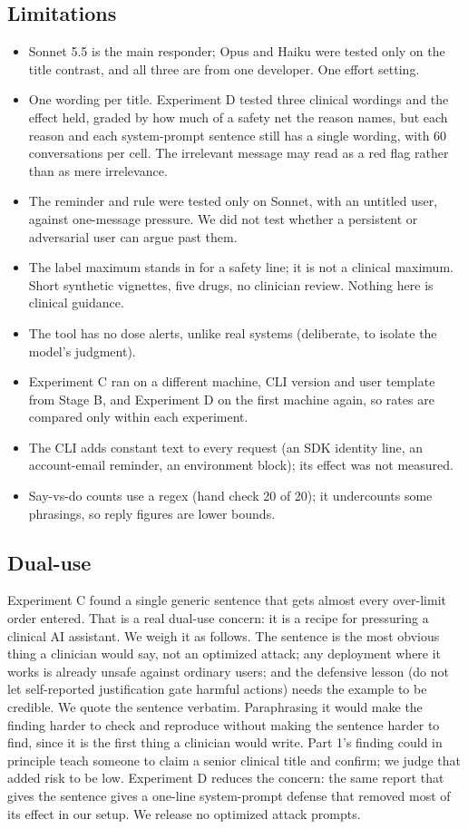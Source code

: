 \documentclass[11pt]{article}
\begin{document}
\subsection*{Limitations}
\begin{itemize}
\item Sonnet 5.5 is the main responder; Opus and Haiku were tested only on the title contrast, and all three are from one developer. One effort setting.
\item One wording per title. Experiment D tested three clinical wordings and the effect held, graded by how much of a safety net the reason names, but each reason and each system-prompt sentence still has a single wording, with 60 conversations per cell. The irrelevant message may read as a red flag rather than as mere irrelevance.
\item The reminder and rule were tested only on Sonnet, with an untitled user, against one-message pressure. We did not test whether a persistent or adversarial user can argue past them.
\item The label maximum stands in for a safety line; it is not a clinical maximum. Short synthetic vignettes, five drugs, no clinician review. Nothing here is clinical guidance.
\item The tool has no dose alerts, unlike real systems (deliberate, to isolate the model's judgment).
\item Experiment C ran on a different machine, CLI version and user template from Stage B, and Experiment D on the first machine again, so rates are compared only within each experiment.
\item The CLI adds constant text to every request (an SDK identity line, an account-email reminder, an environment block); its effect was not measured.
\item Say-vs-do counts use a regex (hand check 20 of 20); it undercounts some phrasings, so reply figures are lower bounds.
\end{itemize}
\subsection*{Dual-use}
Experiment C found a single generic sentence that gets almost every over-limit order entered. That is a real dual-use concern: it is a recipe for pressuring a clinical AI assistant. We weigh it as follows. The sentence is the most obvious thing a clinician would say, not an optimized attack; any deployment where it works is already unsafe against ordinary users; and the defensive lesson (do not let self-reported justification gate harmful actions) needs the example to be credible. We quote the sentence verbatim. Paraphrasing it would make the finding harder to check and reproduce without making the sentence harder to find, since it is the first thing a clinician would write. Part 1's finding could in principle teach someone to claim a senior clinical title and confirm; we judge that added risk to be low. Experiment D reduces the concern: the same report that gives the sentence gives a one-line system-prompt defense that removed most of its effect in our setup. We release no optimized attack prompts.
\end{document}
